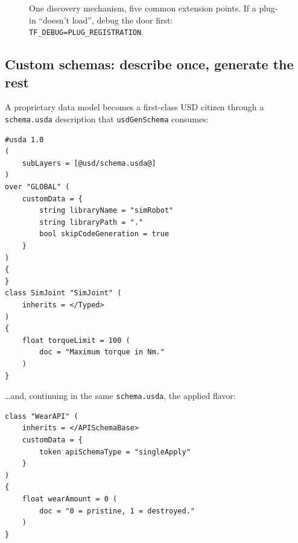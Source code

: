 \begin{figure}[ht]
  \centering
  \caption{One discovery mechanism, five common extension points. If a
  plug-in ``doesn't load'', debug the door first:
  \texttt{TF\_DEBUG=PLUG\_REGISTRATION}.}
  \label{fig:plugin-map}
\end{figure}

\subsection{Custom schemas: describe once, generate the rest}\label{sec:cu-schemas}
A proprietary data model becomes a first-class USD
citizen through a \texttt{schema.usda} description that
\texttt{usdGenSchema} consumes:

\begin{lstlisting}
#usda 1.0
(
    subLayers = [@usd/schema.usda@]
)
over "GLOBAL" (
    customData = {
        string libraryName = "simRobot"
        string libraryPath = "."
        bool skipCodeGeneration = true
    }
)
{
}
class SimJoint "SimJoint" (
    inherits = </Typed>
)
{
    float torqueLimit = 100 (
        doc = "Maximum torque in Nm."
    )
}
\end{lstlisting}

\noindent \ldots and, continuing in the same \texttt{schema.usda}, the
applied flavor:

\begin{lstlisting}
class "WearAPI" (
    inherits = </APISchemaBase>
    customData = {
        token apiSchemaType = "singleApply"
    }
)
{
    float wearAmount = 0 (
        doc = "0 = pristine, 1 = destroyed."
    )
}
\end{lstlisting}


